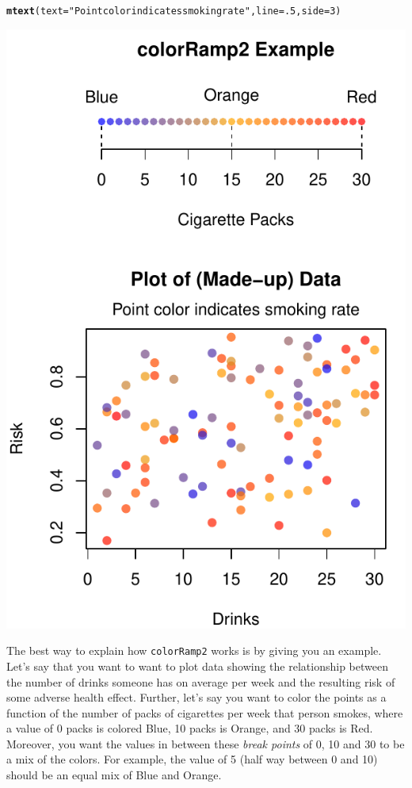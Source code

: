 \documentclass{tufte-book}\usepackage[]{graphicx}\usepackage[]{color}
\makeatletter
\def\maxwidth{ %
  \ifdim\Gin@nat@width>\linewidth
    \linewidth
  \else
    \Gin@nat@width
  \fi
}
\newcommand{\hlnum}[1]{\textcolor[rgb]{0.686,0.059,0.569}{#1}}%
\newcommand{\hlstr}[1]{\textcolor[rgb]{0.192,0.494,0.8}{#1}}%
\newcommand{\hlstd}[1]{\textcolor[rgb]{0.345,0.345,0.345}{#1}}%
\newcommand{\hlkwc}[1]{\textcolor[rgb]{0.333,0.667,0.333}{#1}}%
\newcommand{\hlkwd}[1]{\textcolor[rgb]{0.737,0.353,0.396}{\textbf{#1}}}%
\newenvironment{kframe}{%
 \def\at@end@of@kframe{}%
 \ifinner\ifhmode%
  \def\at@end@of@kframe{\end{minipage}}%
  \begin{minipage}{\columnwidth}%
 \fi\fi%
 \def\FrameCommand##1{\hskip\@totalleftmargin \hskip-\fboxsep
 \colorbox{shadecolor}{##1}\hskip-\fboxsep
     \hskip-\linewidth \hskip-\@totalleftmargin \hskip\columnwidth}%
 \MakeFramed {\advance\hsize-\width
   \@totalleftmargin\z@ \linewidth\hsize
   \@setminipage}}%
 {\par\unskip\endMakeFramed%
 \at@end@of@kframe}
\newenvironment{knitrout}{}{} %
\makeatother
\begin{document}
\begin{footnotesize}
\begin{marginfigure}
\begin{tiny}
\begin{knitrout}
\begin{kframe}
\begin{alltt}
\hlkwd{mtext}\hlstd{(}\hlkwc{text} \hlstd{=} \hlstr{"Point color indicates smoking rate"}\hlstd{,} \hlkwc{line} \hlstd{=} \hlnum{.5}\hlstd{,} \hlkwc{side} \hlstd{=} \hlnum{3}\hlstd{)}
\end{alltt}
\end{kframe}
\includegraphics[width=\maxwidth]{figure/unnamed-chunk-179-1} 

\end{knitrout}
\end{tiny}
\label{fig:colorramp}
\end{marginfigure}


The best way to explain how \texttt{colorRamp2} works is by giving you an example. Let's say that you want to want to plot data showing the relationship between the number of drinks someone has on average per week and the resulting risk of some adverse health effect. Further, let's say you want to color the points as a function of the number of packs of cigarettes per week that person smokes, where a value of 0 packs is colored Blue, 10 packs is Orange, and 30 packs is Red. Moreover, you want the values in between these \textit{break points} of 0, 10 and 30 to be a mix of the colors. For example, the value of 5 (half way between 0 and 10) should be an equal mix of Blue and Orange.


\end{footnotesize}
\end{document}
